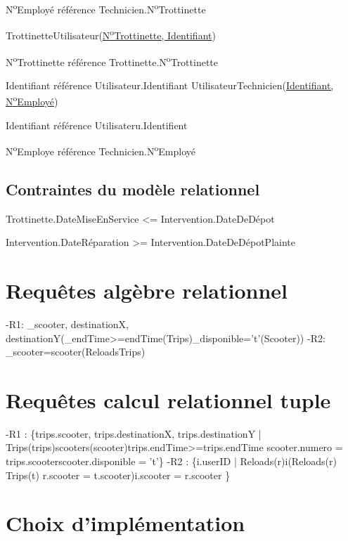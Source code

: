 \documentclass{article}
\newcommand\tab[1][1cm]{\hspace*{#1}}
\begin{document}
\tab N\textsuperscript{o}Employé référence Technicien.N\textsuperscript{o}Trottinette

\bigbreak
TrottinetteUtilisateur(\underline{N\textsuperscript{o}Trottinette, Identifiant})

\tab N\textsuperscript{o}Trottinette référence Trottinette.N\textsuperscript{o}Trottinette

\tab Identifiant référence Utilisateur.Identifiant
\bigbreak
UtilisateurTechnicien(\underline{Identifiant, N\textsuperscript{o}Employé})

\tab Identifiant référence Utilisateru.Identifient

\tab N\textsuperscript{o}Employe référence Technicien.N\textsuperscript{o}Employé

\subsection*{Contraintes du modèle relationnel}
Trottinette.DateMiseEnService <= Intervention.DateDeDépot

Intervention.DateRéparation >= Intervention.DateDeDépotPlainte

\section{Requêtes algèbre relationnel}
-R1: \pi_{scooter, destinationX, destinationY}(\sigma_{endTime>=endTime}(Trips)\cap \sigma_{disponible='t'}(Scooter))
\bigbreak
-R2: \sigma_{scooter=scooter}(Reloads\cap Trips)

\section{Requêtes calcul relationnel tuple}
-R1 : \hspace{-0.2cm}\{trips.scooter, trips.destinationX, trips.destinationY | Trips(trips)\land scooters(scooter)\land trips.endTime>=\forall trips.endTime \land scooter.numero = trips.scooter\land scooter.disponible = 't'\}
\bigbreak
-R2 : \hspace{-0.2cm}\{i.userID | Reloads(r)\land i(Reloads(r) \land Trips(t) \land r.scooter = t.scooter)\land \forall i.scooter =  \forall r.scooter   \}

\section{Choix d'implémentation}
\end{document}
